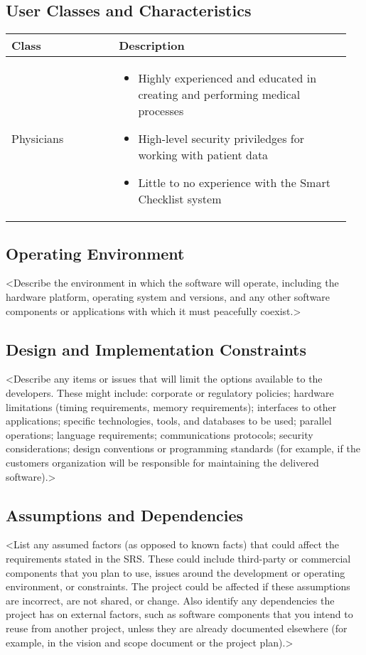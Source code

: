\documentclass{article}
\begin{document}
\subsection{User Classes and Characteristics}

\begin{tabular}{| p{0.3\linewidth} | p{0.65\linewidth} |}
  \hline
  \textbf{Class} & \textbf{Description} \\
  \hline
  \hline
  Physicians & \begin{itemize}
    \item Highly experienced and educated in creating and performing medical processes
    \item High-level security priviledges for working with patient data
    \item Little to no experience with the Smart Checklist system
  \end{itemize} \\
  \hline
\end{tabular}


\subsection{Operating Environment}
<Describe the environment in which the software will operate, including the hardware platform, operating system and versions, and any other software components or applications with which it must peacefully coexist.>

\subsection{Design and Implementation Constraints}
<Describe any items or issues that will limit the options available to the developers. These might include: corporate or regulatory policies; hardware limitations (timing requirements, memory requirements); interfaces to other applications; specific technologies, tools, and databases to be used; parallel operations; language requirements; communications protocols; security considerations; design conventions or programming standards (for example, if the customers organization will be responsible for maintaining the delivered software).>

\subsection{Assumptions and Dependencies}
<List any assumed factors (as opposed to known facts) that could affect the requirements stated in the SRS. These could include third-party or commercial components that you plan to use, issues around the development or operating environment, or constraints. The project could be affected if these assumptions are incorrect, are not shared, or change. Also identify any dependencies the project has on external factors, such as software components that you intend to reuse from another project, unless they are already documented elsewhere (for example, in the vision and scope document or the project plan).>
\end{document}
